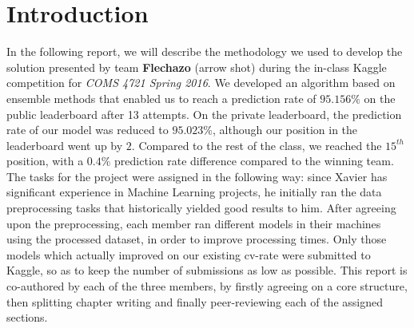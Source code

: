 
\chapter{Introduction}\label{ch:introduction}
In the following report, we will describe the methodology we used to develop the solution presented by team \textbf{Flechazo} (arrow shot) during the in-class Kaggle competition for \textit{COMS 4721 Spring 2016}.
We developed an algorithm based on ensemble methods that enabled us to reach a prediction rate of $95.156\%$ on the public leaderboard after 13 attempts. On the private leaderboard, the prediction rate of our model was reduced to $95.023\%$, although our position in the leaderboard went up by $2$. Compared to the rest of the class, we reached the $15^{th}$ position, with a $0.4\%$ prediction rate difference compared to the winning team.\vspace{.5cm}\\
The tasks for the project were assigned in the following way: since Xavier has significant experience in Machine Learning projects, he initially ran the data preprocessing tasks that historically yielded good results to him. After agreeing upon the preprocessing, each member ran different models in their machines using the processed dataset, in order to improve processing times. Only those models which actually improved on our existing cv-rate were submitted to Kaggle, so as to keep the number of submissions as low as possible. This report is co-authored by each of the three members, by firstly agreeing on a core structure, then splitting chapter writing and finally peer-reviewing each of the assigned sections.